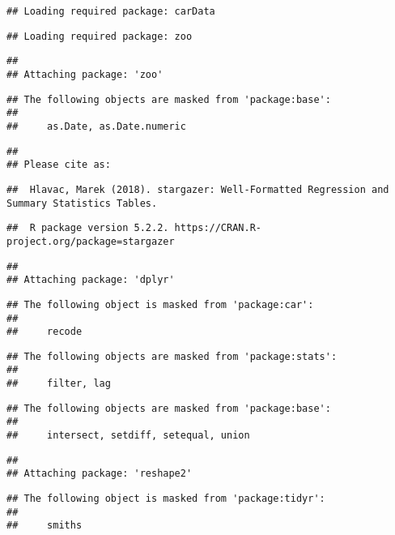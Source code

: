 \documentclass[
]{article}
\author{}
\date{\vspace{-2.5em}}
\begin{document}
\begin{verbatim}
## Loading required package: carData
\end{verbatim}

\begin{verbatim}
## Loading required package: zoo
\end{verbatim}

\begin{verbatim}
## 
## Attaching package: 'zoo'
\end{verbatim}

\begin{verbatim}
## The following objects are masked from 'package:base':
## 
##     as.Date, as.Date.numeric
\end{verbatim}

\begin{verbatim}
## 
## Please cite as:
\end{verbatim}

\begin{verbatim}
##  Hlavac, Marek (2018). stargazer: Well-Formatted Regression and Summary Statistics Tables.
\end{verbatim}

\begin{verbatim}
##  R package version 5.2.2. https://CRAN.R-project.org/package=stargazer
\end{verbatim}

\begin{verbatim}
## 
## Attaching package: 'dplyr'
\end{verbatim}

\begin{verbatim}
## The following object is masked from 'package:car':
## 
##     recode
\end{verbatim}

\begin{verbatim}
## The following objects are masked from 'package:stats':
## 
##     filter, lag
\end{verbatim}

\begin{verbatim}
## The following objects are masked from 'package:base':
## 
##     intersect, setdiff, setequal, union
\end{verbatim}

\begin{verbatim}
## 
## Attaching package: 'reshape2'
\end{verbatim}

\begin{verbatim}
## The following object is masked from 'package:tidyr':
## 
##     smiths
\end{verbatim}
\end{document}
